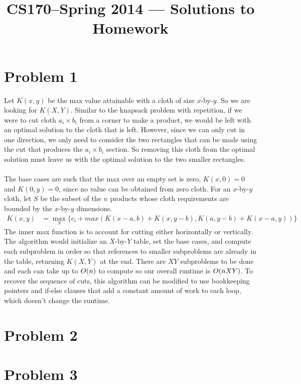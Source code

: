 \documentclass[11pt]{article}
\title{CS170--Spring 2014 --- Solutions to Homework \Homework}
\author{\Name}
\let\origleft\left
\let\origright\right
\renewcommand{\left}{\mathopen{}\mathclose\bgroup\origleft}
\renewcommand{\right}{\aftergroup\egroup\origright}
\newcommand{\p}[1]{\left(#1\right)}
\newcommand{\BigOh}[1]{O\p{#1}}
\begin{document}
\maketitle
{}
\setcounter{problemnumber}{0}

\section*{Problem 1}
Let $K(x,y)$ be the max value attainable with a cloth of size $x$-by-$y$. So we are looking for $K(X,Y)$.
Similar to the knapsack problem with repetition, if we were to cut cloth $a_i\times b_i$ from a corner to make a product, we would be left with an optimal solution to the cloth that is left. However, since we can only cut in one direction, we only need to consider the two rectangles that can be made using the cut that produces the $a_i\times b_i$ section. So removing this cloth from the optimal solution must leave us with the optimal solution to the two smaller rectangles. \\\\
The base cases are such that the max over an empty set is zero, $K(x,0)=0$ and $K(0,y)=0$, since no value can be obtained from zero cloth. For an $x$-by-$y$ cloth, let $S$ be the subset of the $n$ products whose cloth requirements are bounded by the $x$-by-$y$ dimensions.
\begin{align*}
K(x,y)&=\max_S\{c_i+max(K(x-a,b)+K(x,y-b), K(a,y-b)+K(x-a,y))\}
\end{align*}
The inner max function is to account for cutting either horizontally or vertically. The algorithm would initialize an $X$-by-$Y$ table, set the base cases, and compute each subproblem in order so that references to smaller subproblems are already in the table, returning $K(X,Y)$ at the end. There are $XY$ subproblems to be done and each can take up to $\BigOh{n}$ to compute so our overall runtime is $\BigOh{nXY}$. To recover the sequence of cuts, this algorithm can be modified to use bookkeeping pointers and if-else clauses that add a constant amount of work to each loop, which doesn't change the runtime.

\newpage
\section*{Problem 2}


\newpage
\section*{Problem 3}
\end{document}
